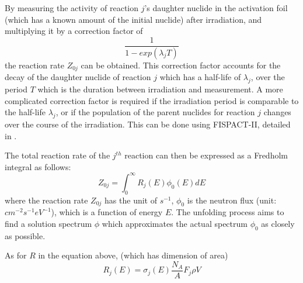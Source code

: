\documentclass[a4paper, 12pt]{article}
\begin{document}
By measuring the activity of reaction $j$'s daughter nuclide in the activation foil (which has a known amount of the initial nuclide) after irradiation, and multiplying it by a correction factor of 
\begin{equation}
    \frac{1}{{1-exp({\lambda_j}T)}}
\end{equation}
the reaction rate $Z_{0j}$ can be obtained. This correction factor accounts for the decay of the daughter nuclide of reaction $j$ which has a half-life of $\lambda_j$, over the period $T$ which is the duration between irradiation and measurement. A more complicated correction factor is required if the irradiation period is comparable to the half-life $\lambda_j$, or if the population of the parent nuclides for reaction $j$ changes over the course of the irradiation. This can be done using FISPACT-II, detailed in \cite{LWP_LTIS}.

The total reaction rate of the $j^{th}$ reaction can then be expressed as a Fredholm integral as follows:
\begin{equation}
    Z_{0j}= \int_{0}^{\infty} R_{j}(E) \phi_0(E) {d}E
\end{equation}
where the reaction rate $Z_{0j}$ has the unit of $s^{-1}$,
$\phi_0$ is the neutron flux (unit: $cm^{-2} s^{-1} eV^{-1}$), which is a function of energy $E$. The unfolding process aims to find a solution spectrum $\phi$ which approximates the actual spectrum $\phi_0$ as closely as possible. 


As for $R$ in the equation above, (which has dimension of area)
\begin{equation}
    R_j(E) =\sigma_{j}(E) \frac{N_A } {A} F_j \rho V
\end{equation}
\end{document}
